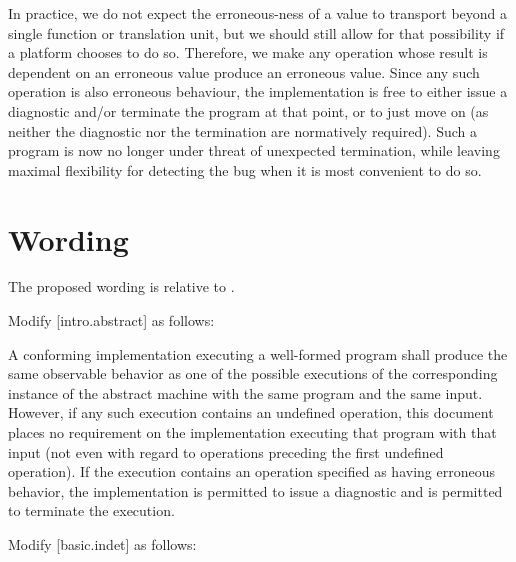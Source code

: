 In practice, we do not expect the erroneous-ness of a value to transport beyond a single function or translation unit, but we should still allow for that possibility if a platform chooses to do so.   Therefore, we make any operation whose result is dependent on an erroneous value produce an erroneous value. Since any such operation is also erroneous behaviour, the implementation is free to either issue a diagnostic and/or terminate the program at that point, or to just move on (as neither the diagnostic nor the termination are normatively required). Such a program is now no longer under threat of unexpected termination, while leaving maximal flexibility for detecting the bug when it is most convenient to do so.

\section{Wording}

The proposed wording is relative to \cite{N5014}. 

Modify [intro.abstract] as follows:

\begin{adjustwidth}{0.5cm}{0.5cm}
A conforming implementation executing a well-formed program shall produce the same observable behavior as one of the possible executions of the corresponding instance of the abstract machine with the same program and the same input. However, if any such execution contains an undefined operation, this document places no requirement on the implementation executing that program with that input (not even with regard to operations preceding the first undefined operation). If the execution contains an operation specified as having erroneous behavior, the implementation is permitted to issue a diagnostic and is permitted to terminate the execution.
\end{adjustwidth}


Modify [basic.indet] as follows:


